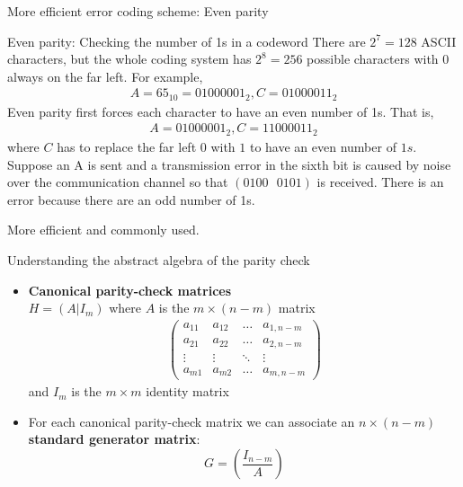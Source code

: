 \documentclass{beamer}
\begin{document}
\begin{frame}{More efficient error coding scheme: Even parity}
    \begin{exampleblock}{Even parity: Checking the number of 1s in a codeword}
        There are $2^7=128$ ASCII characters, but the whole coding system has $2^8=256$ possible characters with $0$ always on the far left. For example, 
        \begin{align*}
        A=65_{10}=01000001_2, C=01000011_2    
        \end{align*}
        Even parity first forces each character to have an even number of 1s. That is, 
        \begin{align*}
            A=01000001_2, C=11000011_2
        \end{align*} where $C$ has to replace the far left $0$ with $1$ to have an even number of $1s$. Suppose an A is sent and a transmission error in the sixth bit is caused by noise over the communication channel so that $(0100\text{ }0101)$ is received. There is an error because there are an odd number of 1s. 
    \end{exampleblock}
    More efficient and commonly used.
\end{frame}

\begin{frame}{Understanding the abstract algebra of the parity check}
\begin{itemize}
  \item \textbf{Canonical parity-check matrices}\\
  $H=(A|I_m)$ where $A$ is the $m\times(n-m)$ matrix
  \begin{align*}
    \begin{pmatrix}
        a_{11} & a_{12} & \dots & a_{1,n-m} \\
        a_{21} & a_{22} & \dots & a_{2,n-m} \\
        \vdots & \vdots & \ddots & \vdots \\
        a_{m1} & a_{m2} & \dots & a_{m,n-m}
    \end{pmatrix}
      \end{align*}
     and $I_m$ is the $m\times m$ identity matrix
  \item For each canonical parity-check matrix we can associate an $n\times (n-m)$ \textbf{standard generator matrix}:
  \[
      G=\left( \displaystyle{\frac{I_{n-m}}{A}} \right)
    \]
\end{itemize}
\end{frame}
\end{document}
